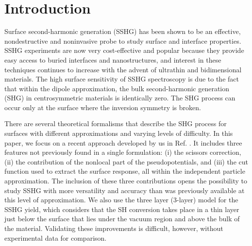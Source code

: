 \documentclass[prb,superscriptaddress,showpacs,twocolumn,letterpaper]{revtex4}
\begin{document}
\section{Introduction}\label{sec:intro}

Surface second-harmonic generation (SSHG) has been shown to be an effective,
nondestructive and noninvasive probe to study surface and interface
properties.\cite{bloembergenAPB99, chenPRL81, daumPRL93, downerPSSA01,
downerSIA01, hughesPRB96, mcgilpOE94, mcgilpSRL99, mendozaPRL98, shenNAT89} SSHG
experiments are now very cost-effective and popular because they provide easy
access to buried interfaces and nanostructures, and interest in these techniques
continues to increase with the advent of ultrathin and bidimensional
materials.\cite{deanPRB14, malardPRB13} The high surface sensitivity of SSHG
spectroscopy is due to the fact that within the dipole approximation, the bulk
second-harmonic generation (SHG) in centrosymmetric materials is identically
zero. The SHG process can occur only at the surface where the inversion symmetry
is broken.

There are several theoretical formalisms that describe the SHG process for
surfaces with different approximations and varying levels of
difficulty.\cite{levinePRB94,mendozaPRL98, arzatePRB01, mendozaPRB01,
mejiaPRB02, sanoPRB02, mejiaRMF04, trollePRB14} In this paper, we focus on a
recent approach developed by us in Ref. . It includes
three features not previously found in a single formulation: (i) the scissors
correction, (ii) the contribution of the nonlocal part of the pseudopotentials,
and (iii) the cut function used to extract the surface response, all within the
independent particle approximation. The inclusion of these three contributions
opens the possibility to study SSHG with more versatility and accuracy than was
previously available at this level of approximation. We also use the three layer
(3-layer) model for the SSHG yield, which considers that the SH conversion takes
place in a thin layer just below the surface that lies under the vacuum region
and above the bulk of the material. Validating these improvements is difficult,
however, without experimental data for comparison.
\end{document}
